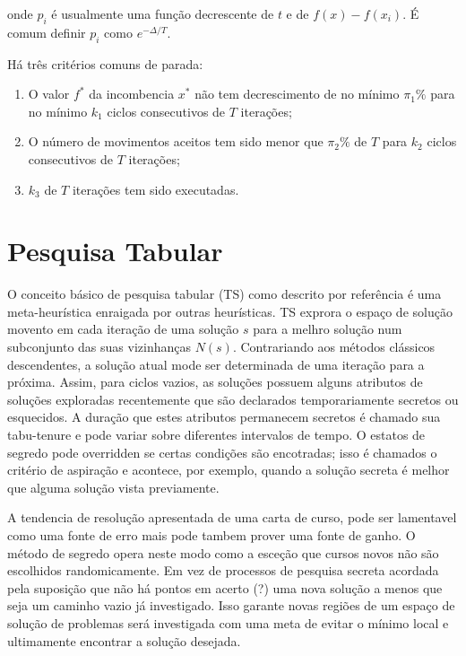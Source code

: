 \documentclass[a4paper, 12pt]{article}
\begin{document}
 onde $p_i$ é usualmente uma função decrescente de $t$ e de $f(x)-f(x_i)$. É comum definir $p_i$
como $e^{-\Delta/T}.$

 Há três critérios comuns de parada:

\begin{enumerate}
\item O valor $f^*$ da incombencia $x^*$ não tem decrescimento de no mínimo $\pi_1\%$ para no mínimo
$k_1$ ciclos consecutivos de $T$ iterações;
\item O número de movimentos aceitos tem sido menor que $\pi_2\%$ de $T$ para $k_2$ ciclos
consecutivos de $T$ iterações;
\item $k_3$ de $T$ iterações tem sido executadas.
\end{enumerate}

\section{Pesquisa Tabular}

 O conceito básico de pesquisa tabular (TS) como descrito por {\color{red} referência} é uma
meta-heurística enraigada por outras heurísticas. TS exprora o espaço de solução movento em cada
iteração de uma solução $s$ para a melhro solução num subconjunto das suas vizinhanças $N(s)$.
Contrariando aos métodos clássicos descendentes, a solução atual mode ser determinada de uma
iteração para a próxima. Assim, para ciclos vazios, as soluções possuem alguns atributos de soluções
exploradas recentemente que são declarados temporariamente secretos ou esquecidos. A duração que
estes atributos permanecem secretos é chamado sua tabu-tenure e pode variar sobre diferentes
intervalos de tempo. O estatos de segredo pode overridden se certas condições são encotradas; isso é
chamados o critério de aspiração e acontece, por exemplo, quando a solução secreta é melhor que
alguma solução vista previamente.

 A tendencia de resolução apresentada de uma carta de curso, pode ser lamentavel como uma fonte de
erro mais pode tambem prover uma fonte de ganho. O método de segredo opera neste modo como a esceção
que cursos novos não são escolhidos randomicamente. Em vez de processos de pesquisa secreta acordada
pela suposição que não há pontos em acerto (?) uma nova solução a menos que seja um caminho vazio já
investigado. Isso garante novas regiões de um espaço de solução de problemas será investigada com
uma meta de evitar o mínimo local e ultimamente encontrar a solução desejada.
\end{document}
